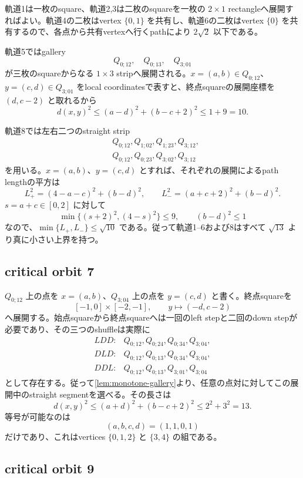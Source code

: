 \documentclass[11pt,a4paper]{ltjsarticle}
\theoremstyle{definition}
\theoremstyle{remark}
\begin{document}
軌道1は一枚のsquare、軌道2,3は二枚のsquareを一枚の $2\times1$ rectangleへ展開すればよい。軌道4の二枚はvertex $\{0,1\}$ を共有し、軌道6の二枚はvertex $\{0\}$ を共有するので、各点から共有vertexへ行くpathにより $2\sqrt2$ 以下である。

軌道5ではgallery
\[
 Q_{0;12},\quad Q_{0;13},\quad Q_{3;01}
\]
が三枚のsquareからなる $1\times3$ stripへ展開される。$x=(a,b)\in Q_{0;12}$、$y=(c,d)\in Q_{3;01}$ をlocal coordinatesで表すと、終点squareの展開座標を $(d,c-2)$ と取れるから
\[
 d(x,y)^2\leq(a-d)^2+(b-c+2)^2\leq1+9=10.
\]

軌道8では左右二つのstraight strip
\[
 \begin{split}
 &Q_{0;12},Q_{1;02},Q_{1;23},Q_{3;12},\\
 &Q_{0;12},Q_{0;23},Q_{3;02},Q_{3;12}
 \end{split}
\]
を用いる。$x=(a,b)$、$y=(c,d)$ とすれば、それぞれの展開によるpath lengthの平方は
\[
 L_+^2=(4-a-c)^2+(b-d)^2,
 \qquad
 L_-^2=(a+c+2)^2+(b-d)^2.
\]
$s=a+c\in[0,2]$ に対して
\[
 \min\{(s+2)^2,(4-s)^2\}\leq9,
 \qquad (b-d)^2\leq1
\]
なので、$\min\{L_+,L_-\}\leq\sqrt{10}$ である。従って軌道1--6および8はすべて $\sqrt{13}$ より真に小さい上界を持つ。

\subsection{critical orbit 7}

$Q_{0;12}$ 上の点を $x=(a,b)$、$Q_{3;04}$ 上の点を $y=(c,d)$ と書く。終点squareを
\[
 [-1,0]\times[-2,-1],
 \qquad y\longmapsto(-d,c-2)
\]
へ展開する。始点squareから終点squareへは一回のleft stepと二回のdown stepが必要であり、その三つのshuffleは実際に
\[
 \begin{array}{ll}
 LDD:&Q_{0;12},Q_{0;24},Q_{0;34},Q_{3;04},\\
 DLD:&Q_{0;12},Q_{0;13},Q_{0;34},Q_{3;04},\\
 DDL:&Q_{0;12},Q_{0;13},Q_{3;01},Q_{3;04}
 \end{array}
\]
として存在する。従って\cref{lem:monotone-gallery}より、任意の点対に対してこの展開中のstraight segmentを選べる。その長さは
\begin{equation}\label{eq:orbit7-global}
 d(x,y)^2\leq(a+d)^2+(b-c+2)^2\leq2^2+3^2=13.
\end{equation}
等号が可能なのは
\[
 (a,b,c,d)=(1,1,0,1)
\]
だけであり、これはvertices $\{0,1,2\}$ と $\{3,4\}$ の組である。

\subsection{critical orbit 9}
\end{document}
